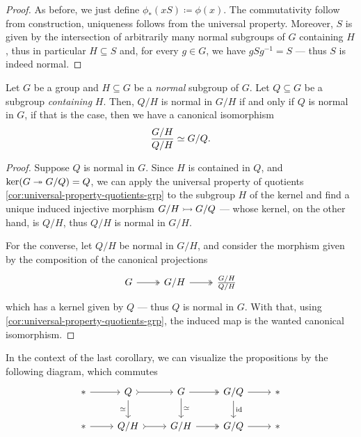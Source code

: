 \begin{proof}
    As before, we just define \(\phi_{*}(x S) \coloneq \phi(x)\). The commutativity
    follow from construction, uniqueness follows from the universal
    property. Moreover, \(S\) is given by the intersection of arbitrarily many
    normal subgroups of \(G\) containing \(H\), thus in particular \(H \subseteq S\)
    and, for every \(g \in G\), we have \(g S g^{-1} = S\) --- thus \(S\) is indeed
    normal.
\end{proof}

\begin{corollary}
    \label{cor:quotient-isomorphism}
    Let \(G\) be a group and \(H \subseteq G\) be a \emph{normal} subgroup of
    \(G\). Let \(Q \subseteq G\) be a subgroup \emph{containing} \(H\). Then,
    \(Q/H\) is normal in \(G/H\) if and only if \(Q\) is normal in \(G\), if that is
    the case, then we have a canonical isomorphism
    \[
        \frac{G/H}{Q/H} \simeq G/Q.
    \]
\end{corollary}

\begin{proof}
    Suppose \(Q\) is normal in \(G\). Since \(H\) is contained in \(Q\), and
    \(\ker(G \twoheadrightarrow G/Q) = Q\), we can apply the universal property of quotients
    \cref{cor:universal-property-quotients-grp} to the subgroup \(H\) of the kernel
    and find a unique induced injective morphism \(G/H \rightarrowtail G/Q\) --- whose kernel,
    on the other hand, is \(Q/H\), thus \(Q/H\) is normal in \(G/H\).

    For the converse, let \(Q/H\) be normal in \(G/H\), and consider the morphism
    given by the composition of the canonical projections
    \[
        \begin{tikzcd}
            G \ar[r, two heads] &G/H \ar[r, two heads] &\frac{G/H}{Q/H}
        \end{tikzcd}
    \]
    which has a kernel given by \(Q\) --- thus \(Q\) is normal in \(G\). With that,
    using \cref{cor:universal-property-quotients-grp}, the induced map is the wanted
    canonical isomorphism.
\end{proof}

In the context of the last corollary, we can visualize the propositions by the
following diagram, which commutes
\[
    \begin{tikzcd}
        * \ar[r] &Q \ar[r, tail] \ar[d, "\iso"']
        &G \ar[r, two heads] \ar[d, "\iso"]
        &G/Q \ar[r] \ar[d, "\Id"] &*
        \\
        * \ar[r] &Q/H \ar[r, tail] &G/H \ar[r, two heads] &G/Q \ar[r] &*
    \end{tikzcd}
\]

